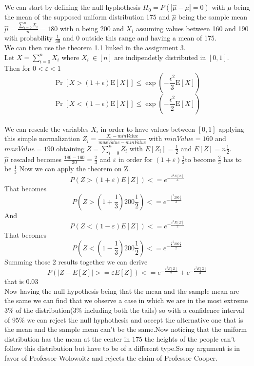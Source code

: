 \documentclass{article}
\begin{document}
\section{}
We can start by defining the null hyphothesis $H_0=P(|\hat{\mu}-\mu|=0)$ with $\mu$ being the mean of the supposed uniform distribution 175 and $\hat{\mu}$ being the sample mean $\hat{\mu}=\frac{\sum_{i=0}^n X_i}{n}=180$ with $n$ being 200 and $X_i$ assuming values between 160 and 190 with probability $\frac{1}{30}$ and 0 outside this range and having a mean of 175.
\\We can then use the theorem 1.1 linked in the assignment 3.
\\Let $X=\sum_{i=0}^nX_i$ where $X_i \ \in [n]$ are indipendetly distributed in $[0,1]$.\\
Then for $0<\varepsilon<1$ $$\operatorname{Pr}[X>(1+\epsilon) \mathrm{E}[X]] \leq \exp \left(-\frac{\epsilon^2}{3} \mathrm{E}[X]\right)$$  $$\operatorname{Pr}[X<(1-\epsilon) \mathrm{E}[X]] \leq \exp \left(-\frac{\epsilon^2}{2} \mathrm{E}[X]\right)$$
\\We can rescale the variables $X_i$ in order to have values between $[0,1]$ applying this simple normalization $Z_i=\frac{X_i-minValue}{maxValue-minValue}$ with $minValue=160$ and $maxValue=190$ obtaining $Z=\sum_{i=0}^n Z_i$ with $E[Z_i]=\frac{1}{2}$ and $E[Z]=n\frac{1}{2}$.\\
$\hat{\mu}$ rescaled becomes $\frac{180-160}{30}=\frac{2}{3}$ and $\varepsilon$ in order for $(1+\varepsilon)\frac{1}{2}$to become $\frac{2}{3}$ has to be $\frac{1}{3}$
Now we can apply the theorem on Z.\\

$$P(Z>(1+\varepsilon)E[Z])<=e^{-\frac{\varepsilon^2 E[Z]}{3}}$$
That becomes
$$P(Z>(1+\frac{1}{3})200\frac{1}{2})<=e^{-\frac{\frac{1}{3}^2 200\frac{1}{2}}{3}}$$
And
$$P(Z<(1-\varepsilon)E[Z])<=e^{-\frac{\varepsilon^2 E[Z]}{2}}$$
That becomes
$$P(Z<(1-\frac{1}{3})200\frac{1}{2})<=e^{-\frac{\frac{1}{3}^2 200\frac{1}{2}}{2}}$$
Summing those 2 results together we can derive 
$$P(|Z-E[Z]|>=\varepsilon E[Z])<=e^{-\frac{\varepsilon^2 E[Z]}{2}}+e^{-\frac{\varepsilon^2 E[Z]}{3}}$$ that is $0.03$\\
Now having the null hypothesis being that the mean and the sample mean are the same we can find that we observe a case in which we are in the most extreme 3\% of the distribution(3\% including both the tails) so with a confidence interval of 95\% we can reject the null hyphothesis and accept the alternative one that is the mean and the sample mean can't be the same.Now noticing that the uniform distribution has the mean at the center in 175 the heights of the people can't follow this distribution but have to be of a different type.So my argument is in favor of Professor Wolowoitz and rejects the claim of Professor Cooper.
\end{document}
